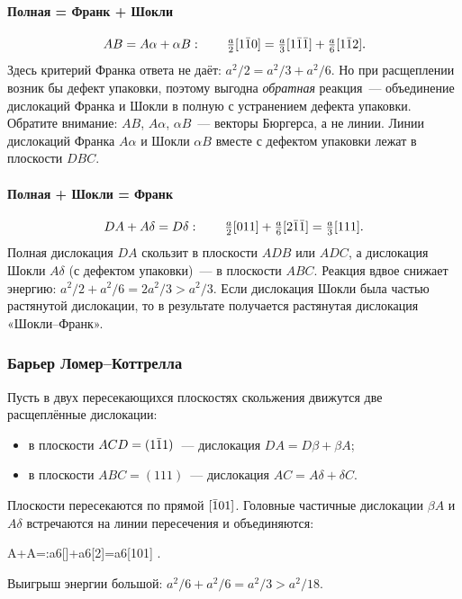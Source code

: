 \paragraph{Полная = Франк + Шокли}
\[
AB=A\alpha+\alpha B:\qquad \tfrac a2[1\bar{1}0]=\tfrac a3[1\bar{1}\bar{1}]+\tfrac a6[1\bar{1}2] .
\]
Здесь критерий Франка ответа не даёт: $a^2/2=a^2/3+a^2/6$. Но при
расщеплении возник бы дефект упаковки, поэтому выгодна \emph{обратная}
реакция~— объединение дислокаций Франка и Шокли в полную с устранением
дефекта упаковки. Обратите внимание: $AB$, $A\alpha$, $\alpha B$~— векторы
Бюргерса, а не линии. Линии дислокаций Франка $A\alpha$ и Шокли $\alpha
B$ вместе с дефектом упаковки лежат в плоскости $DBC$.

\paragraph{Полная + Шокли = Франк}
\[
DA+A\delta=D\delta:\qquad \tfrac a2[011]+\tfrac a6[2\bar{1}\bar{1}]=\tfrac a3[111] .
\]
Полная дислокация $DA$ скользит в плоскости $ADB$ или $ADC$, а дислокация
Шокли $A\delta$ (с дефектом упаковки)~— в плоскости $ABC$. Реакция вдвое
снижает энергию: $a^2/2+a^2/6=2a^2/3>a^2/3$. Если дислокация Шокли была
частью растянутой дислокации, то в результате получается растянутая
дислокация «Шокли--Франк».

\subsubsection{Барьер Ломер--Коттрелла}

Пусть в двух пересекающихся плоскостях скольжения движутся две
расщеплённые дислокации:
\begin{itemize}
\item в плоскости $ACD=(1\bar{1}1)$~— дислокация $DA=D\beta+\beta A$;
\item в плоскости $ABC=(111)$~— дислокация $AC=A\delta+\delta C$.
\end{itemize}
Плоскости пересекаются по прямой $[\bar{1}01]$. Головные частичные
дислокации $\beta A$ и $A\delta$ встречаются на линии пересечения и
объединяются:
\begin{keyeq}\label{eq:lomer-cottrell}
\beta A+A\delta=\beta\delta:\qquad \tfrac a6[]+\tfrac a6[2]=\tfrac a6[101] .
\end{keyeq}
Выигрыш энергии большой: $a^2/6+a^2/6=a^2/3>a^2/18$.


